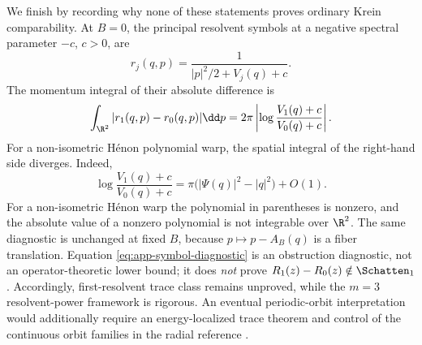 We finish by recording why none of these statements proves ordinary Krein
comparability.  At \(B=0\), the principal resolvent symbols at a negative
spectral parameter \(-c\), \(c>0\), are
\begin{equation}
 r_j(q,p)=\frac{1}{|p|^2/2+V_j(q)+c}.
\end{equation}
The momentum integral of their absolute difference is
\begin{equation}
 \int_{\R^2}|r_1(q,p)-r_0(q,p)|\dd p
 =2\pi\left|\log\frac{V_1(q)+c}{V_0(q)+c}\right|.
 \label{eq:app-symbol-diagnostic}
\end{equation}
For a non-isometric H\'enon polynomial warp, the spatial integral of the
right-hand side diverges.  Indeed,
\[
 \log\frac{V_1(q)+c}{V_0(q)+c}
 =\pi\bigl(|\Psi(q)|^2-|q|^2\bigr)+O(1).
\]
For a non-isometric H\'enon warp the polynomial in parentheses is nonzero,
and the absolute value of a nonzero polynomial is not integrable over
\(\R^2\).  The same diagnostic is unchanged at fixed \(B\),
because \(p\mapsto p-A_B(q)\) is a fiber translation.  Equation
\eqref{eq:app-symbol-diagnostic} is an obstruction diagnostic, not an
operator-theoretic lower bound; it does \emph{not} prove
\(R_1(z)-R_0(z)\notin\Schatten_1\).  Accordingly, first-resolvent trace
class remains unproved, while the \(m=3\) resolvent-power framework is
rigorous.  An eventual periodic-orbit interpretation would additionally
require an energy-localized trace theorem and control of the continuous
orbit families in the radial reference
\citep{DuistermaatGuillemin1975,CombescureRalstonRobert1999}.
